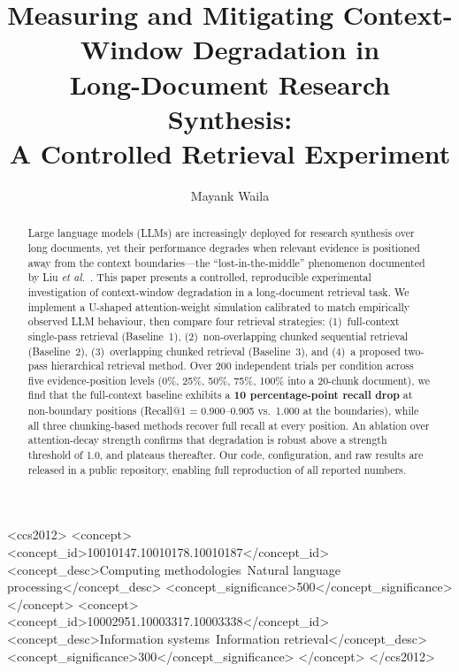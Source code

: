 \documentclass[sigconf,nonacm]{acmart}
\begin{document}
\title{Measuring and Mitigating Context-Window Degradation in\\
Long-Document Research Synthesis:\\
A Controlled Retrieval Experiment}

\author{Mayank Waila}

\begin{abstract}
Large language models (LLMs) are increasingly deployed for research synthesis
over long documents, yet their performance degrades when relevant evidence is
positioned away from the context boundaries—the ``lost-in-the-middle'' phenomenon
documented by Liu \emph{et al.}~\cite{liu2023lost}.
This paper presents a controlled, reproducible experimental investigation of
context-window degradation in a long-document retrieval task.
We implement a U-shaped attention-weight simulation calibrated to match
empirically observed LLM behaviour, then compare four retrieval strategies:
(1)~full-context single-pass retrieval (Baseline~1), (2)~non-overlapping chunked
sequential retrieval (Baseline~2), (3)~overlapping chunked retrieval (Baseline~3),
and (4)~a proposed two-pass hierarchical retrieval method.
Over 200 independent trials per condition across five evidence-position levels
(0\%, 25\%, 50\%, 75\%, 100\% into a 20-chunk document), we find that the full-context
baseline exhibits a \textbf{10 percentage-point recall drop} at non-boundary positions
(Recall@1 = 0.900--0.905 vs.\ 1.000 at the boundaries), while all three
chunking-based methods recover full recall at every position.
An ablation over attention-decay strength confirms that degradation is robust
above a strength threshold of 1.0, and plateaus thereafter.
Our code, configuration, and raw results are released in a public repository,
enabling full reproduction of all reported numbers.
\end{abstract}

\begin{CCSXML}
<ccs2012>
  <concept>
    <concept_id>10010147.10010178.10010187</concept_id>
    <concept_desc>Computing methodologies~Natural language processing</concept_desc>
    <concept_significance>500</concept_significance>
  </concept>
  <concept>
    <concept_id>10002951.10003317.10003338</concept_id>
    <concept_desc>Information systems~Information retrieval</concept_desc>
    <concept_significance>300</concept_significance>
  </concept>
</ccs2012>
\end{CCSXML}
\end{document}
